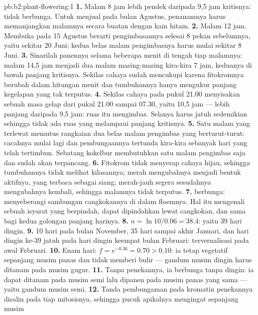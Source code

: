 \begin{solution}{pb:b2:plant-flowering:1}
\textbf{1.} Malam 8 jam lebih pendek daripada 9,5 jam kritisnya: tidak
berbunga. Untuk menjual pada bulan Agustus, penanamnya harus
memanjangkan malamnya secara buatan dengan kain hitam.
\textbf{2.} Malam 12 jam. Membuka pada 15 Agustus berarti
pengimbasannya selesai 8 pekan sebelumnya, yaitu sekitar 20 Juni;
kedua belas malam pengimbasnya harus mulai sekitar 8 Juni.
\textbf{3.} Sinarilah panennya selama beberapa menit di tengah tiap
malamnya: malam 14,5 jam menjadi dua malam masing-masing kira-kira 7
jam, keduanya di bawah panjang kritisnya. Sekilas cahaya sudah
mencukupi karena fitokromnya berubah dalam hitungan menit dan
tumbuhannya hanya mengukur panjang kegelapan yang tak terputus.
\textbf{4.} Sekilas cahaya pada pukul 21.00 menyisakan sebuah masa
gelap dari pukul 21.00 sampai 07.30, yaitu 10,5 jam --- lebih panjang
daripada 9,5 jam: ruas itu mengimbas. Selanya harus jatuh sedemikian
sehingga tidak ada ruas yang melampaui panjang kritisnya.
\textbf{5.} Satu malam yang terlewat memutus rangkaian dua belas malam
pengimbas yang berturut-turut: cacahnya mulai lagi dan pembungaannya
tertunda kira-kira sebanyak hari yang telah tertimbun. Sebatang
kokelbur membutuhkan satu malam pengimbas saja dan sudah akan
terpancang.
\textbf{6.} Fitokrom tidak menyerap cahaya hijau, sehingga tumbuhannya
tidak melihat kilasannya; merah mengubahnya menjadi bentuk aktifnya,
yang terbaca sebagai siang; merah-jauh segera sesudahnya mengubahnya
kembali, sehingga malamnya tidak terputus.
\textbf{7.}  berbunga:  menyeberangi
sambungan cangkokannya di dalam floemnya. Hal itu mengenali sebuah
isyarat yang berpindah, dapat dipindahkan lewat cangkokan, dan sama
bagi kedua golongan panjang harinya.
\textbf{8.} $n = \ln 10/0.06 = 38.4$: yaitu 39 hari dingin.
\textbf{9.} 10 hari pada bulan November, 35 hari sampai akhir Januari,
dan hari dingin ke-39 jatuh pada hari dingin keempat bulan Februari:
tervernalisasi pada awal Februari.
\textbf{10.} Enam hari: $f = e^{-0.36} = 0.70 > 0.10$: ia tetap
vegetatif sepanjang musim panas dan tidak memberi bulir --- gandum
musim dingin harus ditanam pada musim gugur.
\textbf{11.} Tanpa penekannya, ia berbunga tanpa dingin: ia dapat
ditanam pada musim semi lalu dipanen pada musim panas yang sama ---
yaitu gandum musim semi.
\textbf{12.} Tanda pembungaman pada kromatin penekannya disalin pada
tiap mitosisnya, sehingga pucuk apikalnya mengingat sepanjang musim

\end{solution}
